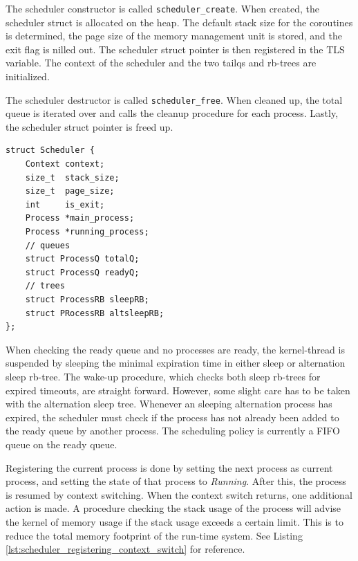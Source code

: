The scheduler constructor is called \texttt{scheduler\_create}. When created, the scheduler struct is allocated on the heap. The default stack size for the coroutines is determined, the page size of the memory management unit is stored, and the exit flag is nilled out. The scheduler struct pointer is then registered in the TLS variable. The context of the scheduler and the two tailqs and rb\hyp{}trees are initialized.

The scheduler destructor is called \texttt{scheduler\_free}. When cleaned up, the total queue is iterated over and calls the cleanup procedure for each process. Lastly, the scheduler struct pointer is freed up. 

\noindent\begin{minipage}{\textwidth}
\begin{lstlisting}[style={CustomC},caption={Scheduler struct type},label={lst:scheduler_struct_type}]
struct Scheduler {
    Context context;
    size_t  stack_size;
    size_t  page_size; 
    int     is_exit;
    Process *main_process;
    Process *running_process;
    // queues
    struct ProcessQ totalQ;
    struct ProcessQ readyQ;
    // trees
    struct ProcessRB sleepRB;
    struct PRocessRB altsleepRB;
};
\end{lstlisting}
\end{minipage}

When checking the ready queue and no processes are ready, the kernel\hyp{}thread is suspended by sleeping the minimal expiration time in either sleep or alternation sleep rb\hyp{}tree. The wake\hyp{}up procedure, which checks both sleep rb\hyp{}trees for expired timeouts, are straight forward. However, some slight care has to be taken with the alternation sleep tree. Whenever an sleeping alternation process has expired, the scheduler must check if the process has not already been added to the ready queue by another process. The scheduling policy is currently a FIFO queue on the ready queue. 

Registering the current process is done by setting the next process as current process, and setting the state of that process to \textit{Running}. After this, the process is resumed by context switching. When the context switch returns, one additional action is made. A procedure checking the stack usage of the process will advise the kernel of memory usage if the stack usage exceeds a certain limit. This is to reduce the total memory footprint of the run\hyp{}time system. See Listing \ref{lst:scheduler_registering_context_switch} for reference.

